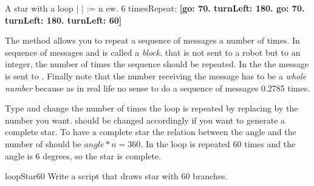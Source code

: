 \begin{scriptwithtitle}{A star with a loop}\label{scr:starloop}
| \caro |
\caro := \Turtle n
 ew.
6 timesRepeat: 
     \textbf{\textbf{[}\caro go: 70.
     \caro turnLeft: 180.
     \caro go: 70.
     \caro turnLeft: 180.
     \caro turnLeft: 60\textbf{]}}
\end{scriptwithtitle} 



The method \timesRepeat allows you to repeat a sequence of messages a  number of times. In \sq{} sequence of messages  \ct{[} and \ct{]} is called a \emph{block}. \add{\paragraph
}
 that \timesRepeat is not sent to a robot but to an integer, the number of times the sequence should be repeated. In the
 the message \timesRepeat \ct{[...]} is sent
to . \add{\paragraph
}
Finally note that the number receiving the message \timesRepeat has to be  a \emph{whole number}  because as in real life  no sense to do a sequence of 
messages 0.2785 times.



Type   and change the number of
times the loop is repeated by replacing  by the number you want.
  should be changed accordingly if you want
to generate a complete star. To have a complete star the relation
between the angle and the number of  should be $angle * n =
360$. In   the loop is repeated 60 times and the angle is 6 degrees, so the star is complete. 

\begin{exofig}{loopStar60}\label{scr:starsixty}
Write a script that draws  star with 60 branches.
\end{exofig}

